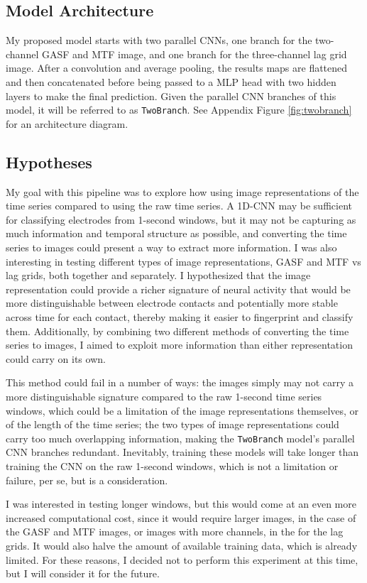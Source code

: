 \documentclass{article}
\begin{document}
\subsection{Model Architecture}
My proposed model starts with two parallel CNNs, one branch for the two-channel GASF and MTF image, and one branch for the three-channel lag grid image. After a convolution and average pooling, the results maps are flattened and then concatenated before being passed to a MLP head with two hidden layers to make the final prediction. Given the parallel CNN branches of this model, it will be referred to as \texttt{TwoBranch}. See Appendix Figure \ref{fig:twobranch} for an architecture diagram.

\subsection{Hypotheses}
My goal with this pipeline was to explore how using image representations of the time series compared to using the raw time series. A 1D-CNN may be sufficient for classifying electrodes from 1-second windows, but it may not be capturing as much information and temporal structure as possible, and converting the time series to images could present a way to extract more information. I was also interesting in testing different types of image representations, GASF and MTF vs lag grids, both together and separately. I hypothesized that the image representation could provide a richer signature of neural activity that would be more distinguishable between electrode contacts and potentially more stable across time for each contact, thereby making it easier to fingerprint and classify them. Additionally, by combining two different methods of converting the time series to images, I aimed to exploit more information than either representation could carry on its own. 

This method could fail in a number of ways: the images simply may not carry a more distinguishable signature compared to the raw 1-second time series windows, which could be a limitation of the image representations themselves, or of the length of the time series; the two types of image representations could carry too much overlapping information, making the \texttt{TwoBranch} model's parallel CNN branches redundant. Inevitably, training these models will take longer than training the CNN on the raw 1-second windows, which is not a limitation or failure, per se, but is a consideration.

I was interested in testing longer windows, but this would come at an even more increased computational cost, since it would require larger images, in the case of the GASF and MTF images, or images with more channels, in the for the lag grids. It would also halve the amount of available training data, which is already limited. For these reasons, I decided not to perform this experiment at this time, but I will consider it for the future.
\end{document}
